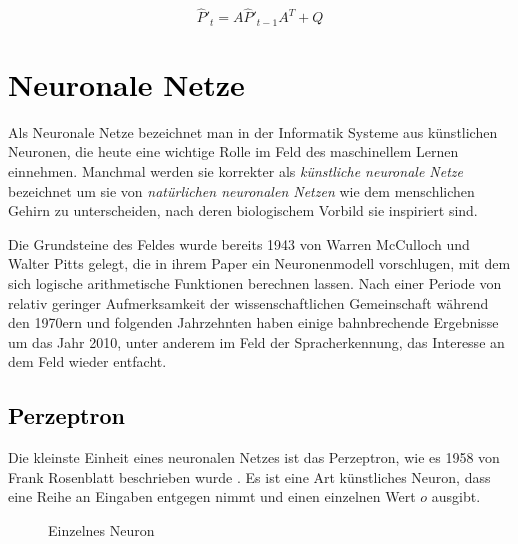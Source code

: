 \begin{equation}
	\hat{P}'_t = A \hat{P}'_{t-1} A^\textit{T} + Q
\end{equation}





\section{\textcolor{black}{Neuronale Netze}}

Als Neuronale Netze  %
bezeichnet man in der Informatik Systeme aus künstlichen Neuronen, die heute eine wichtige Rolle im Feld des maschinellem Lernen einnehmen.
Manchmal werden sie korrekter als \textit{künstliche neuronale Netze} bezeichnet um sie von \textit{natürlichen neuronalen Netzen} 
wie dem menschlichen Gehirn zu unterscheiden, nach deren biologischem Vorbild sie inspiriert sind.

Die Grundsteine des Feldes wurde bereits 1943 von Warren McCulloch und Walter Pitts gelegt, 
die in ihrem Paper \cite{mcculloch1943logical} ein Neuronenmodell vorschlugen, mit dem sich logische arithmetische Funktionen berechnen lassen. 
Nach einer Periode von relativ geringer Aufmerksamkeit der wissenschaftlichen Gemeinschaft während den 1970ern und folgenden Jahrzehnten 
haben einige bahnbrechende Ergebnisse um das Jahr 2010, unter anderem im Feld der Spracherkennung, das Interesse an dem Feld wieder entfacht. 



\subsection{\textcolor{black}{Perzeptron}}
Die kleinste Einheit eines neuronalen Netzes ist das Perzeptron, wie es 1958 von Frank Rosenblatt beschrieben wurde \cite{rosenblatt1958perceptron}.
Es ist eine Art künstliches Neuron, dass eine Reihe an Eingaben entgegen nimmt und einen einzelnen Wert \(o\) ausgibt.

\begin{figure}
    \centering
	\caption{Einzelnes Neuron}
	\label{fig:singleNeuron}
\end{figure}

